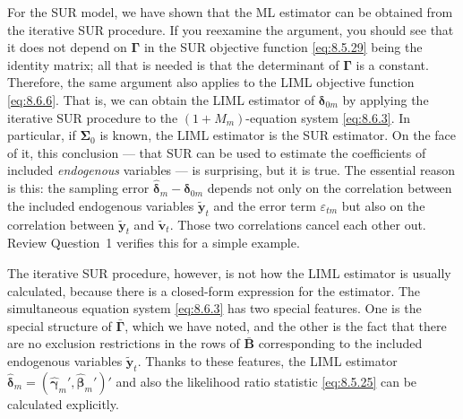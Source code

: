 For the SUR model, we have shown that the ML estimator can be obtained from
the iterative SUR procedure. If you reexamine the argument, you should see that
it does not depend on $\boldsymbol{\Gamma}$ in the SUR objective function \eqref{eq:8.5.29} being the identity
matrix; all that is needed is that the determinant of $\boldsymbol{\Gamma}$ is a constant. Therefore, the
same argument also applies to the LIML objective function \eqref{eq:8.6.6}. That is, we can
obtain the LIML estimator of $\boldsymbol{\delta}_{0m}$ by applying the iterative SUR procedure to the
$(1+M_m)$-equation system \eqref{eq:8.6.3}. In particular, if $\boldsymbol{\Sigma}_0$ is known, the LIML estimator
is the SUR estimator. On the face of it, this conclusion --- that SUR can be used to
estimate the coefficients of included \emph{endogenous} variables --- is surprising, but it is
true. The essential reason is this: the sampling error $\hat{\boldsymbol{\delta}}_m - \boldsymbol{\delta}_{0m}$ depends not only
on the correlation between the included endogenous variables $\tilde{\mathbf{y}}_t$ and the error term
$\varepsilon_{tm}$ but also on the correlation between $\tilde{\mathbf{y}}_t$ and $\tilde{\mathbf{v}}_t$. Those two correlations cancel
each other out. Review Question~1 verifies this for a simple example.

The iterative SUR procedure, however, is not how the LIML estimator is usually calculated, because there is a closed-form expression for the estimator. The
simultaneous equation system \eqref{eq:8.6.3} has two special features. One is the special
structure of $\bar{\boldsymbol{\Gamma}}$, which we have noted, and the other is the fact that there are no
exclusion restrictions in the rows of $\bar{\mathbf{B}}$ corresponding to the included endogenous
variables $\tilde{\mathbf{y}}_t$. Thanks to these features, the LIML estimator
$\hat{\boldsymbol{\delta}}_m = (\hat{\boldsymbol{\gamma}}_m', \hat{\boldsymbol{\beta}}_m')'$ and
also the likelihood ratio statistic \eqref{eq:8.5.25} can be calculated explicitly.

